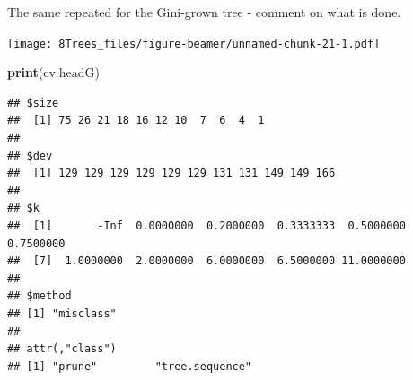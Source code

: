 \documentclass[10pt,ignorenonframetext,]{beamer}
\newenvironment{Shaded}{\begin{snugshade}}{\end{snugshade}}
\newcommand{\KeywordTok}[1]{\textcolor[rgb]{0.13,0.29,0.53}{\textbf{#1}}}
\newcommand{\DataTypeTok}[1]{\textcolor[rgb]{0.13,0.29,0.53}{#1}}
\newcommand{\DecValTok}[1]{\textcolor[rgb]{0.00,0.00,0.81}{#1}}
\newcommand{\StringTok}[1]{\textcolor[rgb]{0.31,0.60,0.02}{#1}}
\newcommand{\OperatorTok}[1]{\textcolor[rgb]{0.81,0.36,0.00}{\textbf{#1}}}
\newcommand{\NormalTok}[1]{#1}
\begin{document}
\begin{frame}[fragile]

The same repeated for the Gini-grown tree - comment on what is done.

\begin{Shaded}
\end{Shaded}

\texttt{[image: 8Trees\_files/figure-beamer/unnamed-chunk-21-1.pdf]}

\end{frame}

\begin{frame}[fragile]

\begin{Shaded}
\begin{Highlighting}[]
\KeywordTok{print}\NormalTok{(cv.headG)}
\end{Highlighting}
\end{Shaded}

\begin{verbatim}
## $size
##  [1] 75 26 21 18 16 12 10  7  6  4  1
## 
## $dev
##  [1] 129 129 129 129 129 129 131 131 149 149 166
## 
## $k
##  [1]       -Inf  0.0000000  0.2000000  0.3333333  0.5000000  0.7500000
##  [7]  1.0000000  2.0000000  6.0000000  6.5000000 11.0000000
## 
## $method
## [1] "misclass"
## 
## attr(,"class")
## [1] "prune"         "tree.sequence"
\end{verbatim}

\end{frame}
\end{document}
